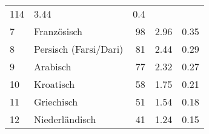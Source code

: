 \begin{longtable}{lXrrr}
       \num{114} &
       \num[round-mode=places,round-precision=2]{3.44} &
         \num[round-mode=places,round-precision=2]{0.4} \\

     7 &
     \multicolumn{1}{X}{ Französisch   } &


       \num{98} &
       \num[round-mode=places,round-precision=2]{2.96} &
         \num[round-mode=places,round-precision=2]{0.35} \\

     8 &
     \multicolumn{1}{X}{ Persisch (Farsi/Dari)   } &


       \num{81} &
       \num[round-mode=places,round-precision=2]{2.44} &
         \num[round-mode=places,round-precision=2]{0.29} \\

     9 &
     \multicolumn{1}{X}{ Arabisch   } &


       \num{77} &
       \num[round-mode=places,round-precision=2]{2.32} &
         \num[round-mode=places,round-precision=2]{0.27} \\

     10 &
     \multicolumn{1}{X}{ Kroatisch   } &


       \num{58} &
       \num[round-mode=places,round-precision=2]{1.75} &
         \num[round-mode=places,round-precision=2]{0.21} \\

     11 &
     \multicolumn{1}{X}{ Griechisch   } &


       \num{51} &
       \num[round-mode=places,round-precision=2]{1.54} &
         \num[round-mode=places,round-precision=2]{0.18} \\

     12 &
     \multicolumn{1}{X}{ Niederländisch   } &


       \num{41} &
       \num[round-mode=places,round-precision=2]{1.24} &
         \num[round-mode=places,round-precision=2]{0.15} \\


\end{longtable}
